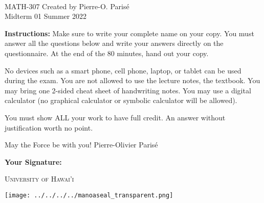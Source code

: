 \documentclass[addpoints, 12pt]{exam}%
\theoremstyle{definition}
\begin{document}
	\noindent \hrulefill \\
	\noindent MATH-307 \hfill Created by Pierre-O. Paris{\'e}\\
	Midterm 01 \hfill Summer 2022\\\vspace*{-0.7cm}

\noindent\hrulefill
	
\vspace*{1cm}

\noindent{}

\vspace*{1cm}
\begin{center}
\gradetable[h][questions]
\end{center}
\vspace*{1cm}

{\bf Instructions:} Make sure to write your complete name on your copy. You must answer all the questions below and write your answers directly on the questionnaire. At the end of the 80 minutes, hand out your copy. 

No devices such as a smart phone, cell phone, laptop, or tablet can be used during the exam. You are not allowed to use the lecture notes, the textbook. You may bring one 2-sided cheat sheet of handwriting notes. You may use a digital calculator (no graphical calculator or symbolic calculator will be allowed).

You must show ALL your work to have full credit. An answer without justification worth no point.

\vspace*{2cm}
\noindent May the Force be with you! \hfill Pierre-Olivier Parisé

\vfill

\noindent\textbf{Your Signature:} \hrulefill

\vspace*{1cm}

\begin{center}
\begin{minipage}{0.3\textwidth}
\begin{Huge}
\textsc{University of Hawai'i}
\end{Huge}
\end{minipage}
\begin{minipage}{0.12\textwidth}
\texttt{[image: ../../../../manoaseal\_transparent.png]}
\end{minipage}
\end{center}
\end{document}
